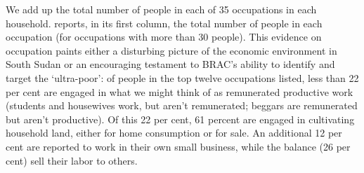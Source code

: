 \documentclass[12pt,letterpaper]{article}
\begin{document}
We add up the total number of people in each of 35 occupations in each
household.   reports, in its first column, the total
number of people in each occupation (for occupations with more than 30
people).  This evidence on occupation paints either a disturbing
picture of the economic environment in South Sudan or an encouraging
testament to BRAC's ability to identify and target the `ultra-poor':
of people in the top twelve occupations listed, less than 22 per cent
are engaged in what we might think of as remunerated productive work
(students and housewives work, but aren't remunerated; beggars are
remunerated but aren't productive).  Of this 22 per cent, 61 percent
are engaged in cultivating household land, either for home consumption
or for sale.  An additional 12 per cent are reported to work in their
own small business, while the balance (26 per cent) sell their labor
to others.
\end{document}
